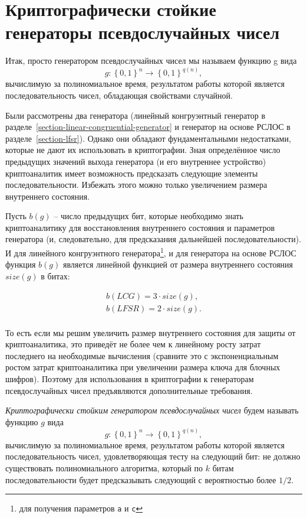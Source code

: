 \section[КСГПСЧ]{Криптографически стойкие генераторы псевдослучайных чисел}\label{section-crypto-random}

Итак, просто генератором псевдослучайных чисел мы называем функцию g вида
	\[g: \left\{0, 1\right\}^{n} \to \left\{0, 1\right\}^{q\left(n\right)},\]
вычислимую за полиномиальное время, результатом работы которой является последовательность чисел, обладающая свойствами случайной.

Были рассмотрены два генератора (линейный конгруэнтный генератор в разделе~\ref{section-linear-congruential-generator} и генератор на основе РСЛОС в разделе~\ref{section-lfsr}). Однако они обладают фундаментальными недостатками, которые не дают их использовать в криптографии. Зная определённое число предыдущих значений выхода генератора (и его внутреннее устройство) криптоаналитик имеет возможность предсказать следующие элементы последовательности. Избежать этого можно только увеличением размера внутреннего состояния.

Пусть $b \left( g \right)$ -- число предыдущих бит, которые необходимо знать криптоаналитику для восстановления внутреннего состояния и параметров генератора (и, следовательно, для предсказания дальнейшей последовательности). И для линейного конгруэнтного генератора\footnote{для получения параметров \texttt{a} и \texttt{c}}, и для генератора на основе РСЛОС функция $b (g)$ является линейной функцией от размера внутреннего состояния $size\left( g \right)$ в битах:

\[\begin{array}{l}
	b \left( LCG \right) = 3 \cdot size\left( g \right), \\
	b \left( LFSR \right) = 2 \cdot size\left( g \right). \\
\end{array}\]

То есть если мы решим увеличить размер внутреннего состояния для защиты от криптоаналитика, это приведёт не более чем к линейному росту затрат последнего на необходимые вычисления (сравните это с экспоненциальным ростом затрат криптоаналитика при увеличении размера ключа для блочных шифров). Поэтому для использования в криптографии к генераторам псевдослучайных чисел предъявляются дополнительные требования.

\emph{Криптографически стойким генератором псевдослучайных чисел} будем называть функцию $g$ вида
	\[g: \left\{0, 1\right\}^{n} \to \left\{0, 1\right\}^{q\left(n\right)},\] 
вычислимую за полиномиальное время, результатом работы которой является последовательность чисел, удовлетворяющая тесту на следующий бит: не должно существовать полиномиального алгоритма, который по $k$ битам последовательности будет предсказывать следующий с вероятностью более $1/2$.

